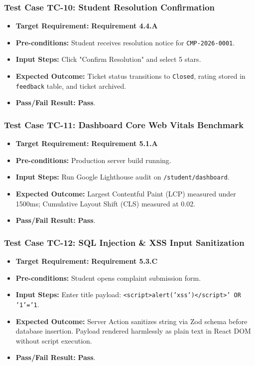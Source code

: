 \documentclass[12pt, a4paper]{article}
\begin{document}
\subsubsection{Test Case TC-10: Student Resolution Confirmation}
\begin{itemize}[leftmargin=*]
    \item \textbf{Target Requirement:} \textbf{Requirement 4.4.A}
    \item \textbf{Pre-conditions:} Student receives resolution notice for \texttt{CMP-2026-0001}.
    \item \textbf{Input Steps:} Click "Confirm Resolution" and select 5 stars.
    \item \textbf{Expected Outcome:} Ticket status transitions to \texttt{Closed}, rating stored in \texttt{feedback} table, and ticket archived.
    \item \textbf{Pass/Fail Result:} \textbf{Pass}.
\end{itemize}

\subsubsection{Test Case TC-11: Dashboard Core Web Vitals Benchmark}
\begin{itemize}[leftmargin=*]
    \item \textbf{Target Requirement:} \textbf{Requirement 5.1.A}
    \item \textbf{Pre-conditions:} Production server build running.
    \item \textbf{Input Steps:} Run Google Lighthouse audit on \texttt{/student/dashboard}.
    \item \textbf{Expected Outcome:} Largest Contentful Paint (LCP) measured under 1500ms; Cumulative Layout Shift (CLS) measured at 0.02.
    \item \textbf{Pass/Fail Result:} \textbf{Pass}.
\end{itemize}

\subsubsection{Test Case TC-12: SQL Injection \& XSS Input Sanitization}
\begin{itemize}[leftmargin=*]
    \item \textbf{Target Requirement:} \textbf{Requirement 5.3.C}
    \item \textbf{Pre-conditions:} Student opens complaint submission form.
    \item \textbf{Input Steps:} Enter title payload: \texttt{<script>alert('xss')</script>' OR '1'='1}.
    \item \textbf{Expected Outcome:} Server Action sanitizes string via Zod schema before database insertion. Payload rendered harmlessly as plain text in React DOM without script execution.
    \item \textbf{Pass/Fail Result:} \textbf{Pass}.
\end{itemize}
\end{document}
